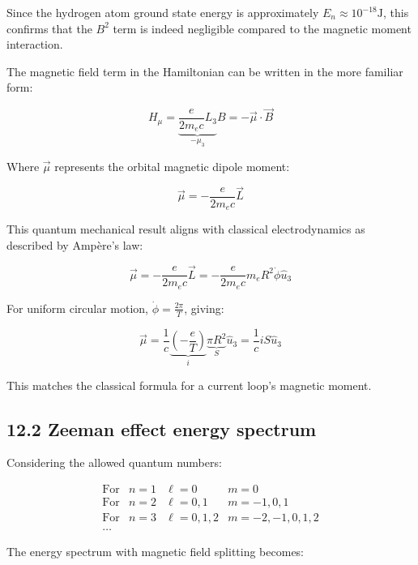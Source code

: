 \documentclass[italian]{HKNdocument}
\begin{document}
Since the hydrogen atom ground state energy is approximately $E_n \approx 10^{-18} \text{J}$, this confirms that the $B^2$ term is indeed negligible compared to the magnetic moment interaction.

The magnetic field term in the Hamiltonian can be written in the more familiar form:

\begin{equation*}
H_{\mu}=\underbrace{\frac{e}{2m_e c}L_3}_{-\mu_3}B=-\vec{\mu}\cdot\vec{B} \tag{12.22}
\end{equation*}

Where $\vec{\mu}$ represents the orbital magnetic dipole moment:

\begin{equation*}
\vec{\mu}=-\frac{e}{2m_e c}\vec{L} \tag{12.23}
\end{equation*}

This quantum mechanical result aligns with classical electrodynamics as described by Ampère's law:

\begin{equation*}
\vec{\mu}=-\frac{e}{2m_e c}\vec{L}=-\frac{e}{2m_e c}m_e R^2\dot{\phi}\hat{u}_3 \tag{12.24}
\end{equation*}

For uniform circular motion, $\dot{\phi}=\frac{2\pi}{T}$, giving:

\begin{equation*}
\vec{\mu}=\frac{1}{c}\underbrace{\left(-\frac{e}{T}\right)}_i \underbrace{\pi R^2}_S \hat{u}_3=\frac{1}{c}iS\hat{u}_3 \tag{12.25}
\end{equation*}

This matches the classical formula for a current loop's magnetic moment.

\subsection*{12.2 Zeeman effect energy spectrum}
Considering the allowed quantum numbers:

$$
\begin{array}{llll}
\text{For} & n=1 & \ell=0 & m=0 \\
\text{For} & n=2 & \ell=0,1 & m=-1,0,1 \\
\text{For} & n=3 & \ell=0,1,2 & m=-2,-1,0,1,2 \\
\ldots & & &
\end{array}
$$

The energy spectrum with magnetic field splitting becomes:
\end{document}
